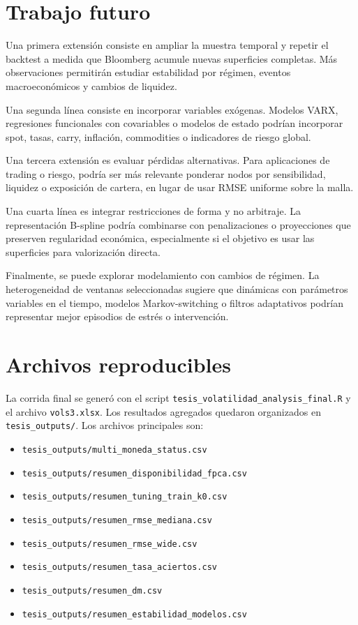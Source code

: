 \documentclass[12pt,a4paper]{article}
\begin{document}
\section{Trabajo futuro}

Una primera extensión consiste en ampliar la muestra temporal y repetir el backtest a medida que Bloomberg acumule nuevas superficies completas. Más observaciones permitirán estudiar estabilidad por régimen, eventos macroeconómicos y cambios de liquidez.

Una segunda línea consiste en incorporar variables exógenas. Modelos VARX, regresiones funcionales con covariables o modelos de estado podrían incorporar spot, tasas, carry, inflación, commodities o indicadores de riesgo global.

Una tercera extensión es evaluar pérdidas alternativas. Para aplicaciones de trading o riesgo, podría ser más relevante ponderar nodos por sensibilidad, liquidez o exposición de cartera, en lugar de usar RMSE uniforme sobre la malla.

Una cuarta línea es integrar restricciones de forma y no arbitraje. La representación B-spline podría combinarse con penalizaciones o proyecciones que preserven regularidad económica, especialmente si el objetivo es usar las superficies para valorización directa.

Finalmente, se puede explorar modelamiento con cambios de régimen. La heterogeneidad de ventanas seleccionadas sugiere que dinámicas con parámetros variables en el tiempo, modelos Markov-switching o filtros adaptativos podrían representar mejor episodios de estrés o intervención.

\appendix
\section{Archivos reproducibles}

La corrida final se generó con el script \texttt{tesis\_volatilidad\_analysis\_final.R} y el archivo \texttt{vols3.xlsx}. Los resultados agregados quedaron organizados en \texttt{tesis\_outputs/}. Los archivos principales son:

\begin{itemize}
  \item \texttt{tesis\_outputs/multi\_moneda\_status.csv}
  \item \texttt{tesis\_outputs/resumen\_disponibilidad\_fpca.csv}
  \item \texttt{tesis\_outputs/resumen\_tuning\_train\_k0.csv}
  \item \texttt{tesis\_outputs/resumen\_rmse\_mediana.csv}
  \item \texttt{tesis\_outputs/resumen\_rmse\_wide.csv}
  \item \texttt{tesis\_outputs/resumen\_tasa\_aciertos.csv}
  \item \texttt{tesis\_outputs/resumen\_dm.csv}
  \item \texttt{tesis\_outputs/resumen\_estabilidad\_modelos.csv}
\end{itemize}
\end{document}
